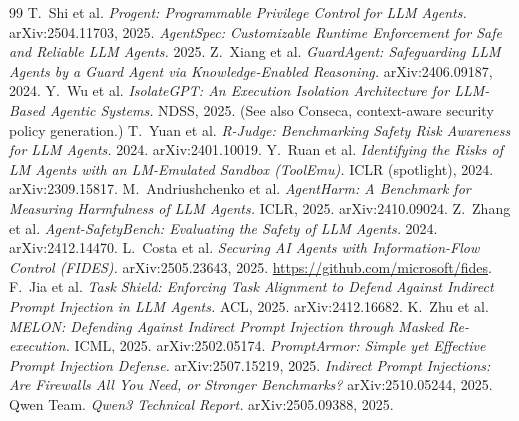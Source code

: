 \documentclass[11pt]{article}
\begin{document}
\begin{thebibliography}{99}
 T.~Shi et al. \emph{Progent: Programmable Privilege Control for LLM Agents.}
  arXiv:2504.11703, 2025.
 \emph{AgentSpec: Customizable Runtime Enforcement for Safe and Reliable LLM
  Agents.} 2025.
 Z.~Xiang et al. \emph{GuardAgent: Safeguarding LLM Agents by a Guard Agent via
  Knowledge-Enabled Reasoning.} arXiv:2406.09187, 2024.
 Y.~Wu et al. \emph{IsolateGPT: An Execution Isolation Architecture for LLM-Based
  Agentic Systems.} NDSS, 2025. (See also Conseca, context-aware security policy generation.)
 T.~Yuan et al. \emph{R-Judge: Benchmarking Safety Risk Awareness for LLM Agents.}
  2024. arXiv:2401.10019.
 Y.~Ruan et al. \emph{Identifying the Risks of LM Agents with an LM-Emulated
  Sandbox (ToolEmu).} ICLR (spotlight), 2024. arXiv:2309.15817.
 M.~Andriushchenko et al. \emph{AgentHarm: A Benchmark for Measuring Harmfulness
  of LLM Agents.} ICLR, 2025. arXiv:2410.09024.
 Z.~Zhang et al. \emph{Agent-SafetyBench: Evaluating the Safety of LLM
  Agents.} 2024. arXiv:2412.14470.
 L.~Costa et al. \emph{Securing AI Agents with Information-Flow Control (FIDES).}
  arXiv:2505.23643, 2025. \url{https://github.com/microsoft/fides}.
 F.~Jia et al. \emph{Task Shield: Enforcing Task Alignment to Defend Against
  Indirect Prompt Injection in LLM Agents.} ACL, 2025. arXiv:2412.16682.
 K.~Zhu et al. \emph{MELON: Defending Against Indirect Prompt Injection through
  Masked Re-execution.} ICML, 2025. arXiv:2502.05174.
 \emph{PromptArmor: Simple yet Effective Prompt Injection Defense.}
  arXiv:2507.15219, 2025.
 \emph{Indirect Prompt Injections: Are Firewalls All You Need, or Stronger
  Benchmarks?} arXiv:2510.05244, 2025.
 Qwen Team. \emph{Qwen3 Technical Report.} arXiv:2505.09388, 2025.
\end{thebibliography}
\end{document}
